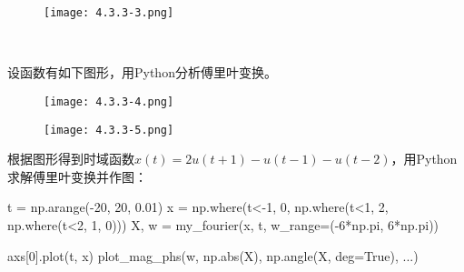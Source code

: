 \begin{figure}[h]
\centering
\texttt{[image: 4.3.3-3.png]}
\end{figure}

~

\begin{example}
设函数有如下图形，用Python分析傅里叶变换。
\begin{figure}[h]
\centering
\texttt{[image: 4.3.3-4.png]}
\end{figure}
\end{example}

\begin{figure}[h]
\centering
\texttt{[image: 4.3.3-5.png]}
\end{figure}

根据图形得到时域函数$x\left( t \right) =2u\left( t+1 \right) -u\left( t-1 \right) -u\left( t-2 \right) $，用Python求解傅里叶变换并作图：

\begin{python}
t    = np.arange(-20, 20, 0.01)
x    = np.where(t<-1, 0, np.where(t<1, 2, np.where(t<2, 1, 0)))
X, w = my_fourier(x, t, w_range=(-6*np.pi, 6*np.pi))

axs[0].plot(t, x)
plot_mag_phs(w, np.abs(X), np.angle(X, deg=True), ...)
\end{python}




